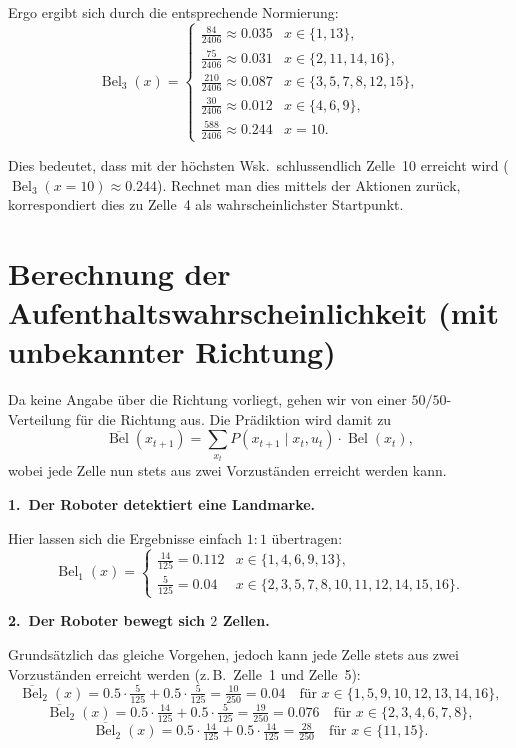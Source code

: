 \documentclass[11pt,a4paper]{article}
\newcommand{\Bel}{\operatorname{Bel}}
\newcommand{\pBel}{\overline{\operatorname{Bel}}}
\begin{document}
Ergo ergibt sich durch die entsprechende Normierung:
\[
  \Bel_3(x) =
  \begin{cases}
    \tfrac{84}{2406}\approx 0.035  & x\in\{1,13\},\\[0.3em]
    \tfrac{75}{2406}\approx 0.031  & x\in\{2,11,14,16\},\\[0.3em]
    \tfrac{210}{2406}\approx 0.087 & x\in\{3,5,7,8,12,15\},\\[0.3em]
    \tfrac{30}{2406}\approx 0.012  & x\in\{4,6,9\},\\[0.3em]
    \tfrac{588}{2406}\approx 0.244 & x=10.
  \end{cases}
\]

Dies bedeutet, dass mit der höchsten Wsk.\ schlussendlich Zelle~10 erreicht wird
($\Bel_3(x=10)\approx 0.244$). Rechnet man dies mittels der Aktionen zurück, korrespondiert dies zu
Zelle~4 als wahrscheinlichster Startpunkt.

\section*{Berechnung der Aufenthaltswahrscheinlichkeit (mit unbekannter Richtung)}

Da keine Angabe über die Richtung vorliegt, gehen wir von einer $50/50$-Verteilung für die
Richtung aus. Die Prädiktion wird damit zu
\[
  \pBel(x_{t+1}) = \sum_{x_t} P(x_{t+1}\mid x_t,u_t)\cdot \Bel(x_t),
\]
wobei jede Zelle nun stets aus zwei Vorzuständen erreicht werden kann.

\textbf{1.\ Der Roboter detektiert eine Landmarke.}

Hier lassen sich die Ergebnisse einfach $1{:}1$ übertragen:
\[
  \Bel_1(x) =
  \begin{cases}
    \tfrac{14}{125}=0.112 & x\in\{1,4,6,9,13\},\\[0.3em]
    \tfrac{5}{125}=0.04   & x\in\{2,3,5,7,8,10,11,12,14,15,16\}.
  \end{cases}
\]

\textbf{2.\ Der Roboter bewegt sich $2$ Zellen.}

Grundsätzlich das gleiche Vorgehen, jedoch kann jede Zelle stets aus zwei Vorzuständen erreicht
werden (z.\,B.\ Zelle~1 und Zelle~5):
\[
  \pBel_2(x) = 0.5\cdot\tfrac{5}{125} + 0.5\cdot\tfrac{5}{125} = \tfrac{10}{250} = 0.04
  \quad\text{für } x\in\{1,5,9,10,12,13,14,16\},
\]
\[
  \pBel_2(x) = 0.5\cdot\tfrac{14}{125} + 0.5\cdot\tfrac{5}{125} = \tfrac{19}{250} = 0.076
  \quad\text{für } x\in\{2,3,4,6,7,8\},
\]
\[
  \pBel_2(x) = 0.5\cdot\tfrac{14}{125} + 0.5\cdot\tfrac{14}{125} = \tfrac{28}{250}
  \quad\text{für } x\in\{11,15\}.
\]
\end{document}
